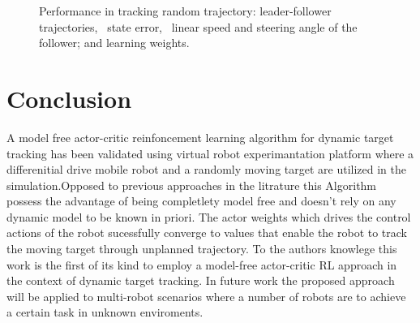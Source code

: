 \documentclass[conference]{IEEEtran}
\begin{document}
\begin{figure}[htbp]
\caption[Leader-follower performance for random trajectory.]{Performance in tracking random trajectory: 
   leader-follower trajectories,~ state error,~ linear speed and steering angle of the follower; and     learning weights.}%
  \label{fig:peformanceRandomTrajectory}%
	\label{fig:simulationResults}
\end{figure}


 \section{Conclusion} \label{sec:conclusion}
	A model free actor-critic reinfoncement learning algorithm for dynamic target tracking has been validated using virtual robot experimantation platform where a differenitial drive mobile robot and a randomly moving target are utilized in the simulation.Opposed to previous approaches in the litrature this Algorithm possess the advantage of being completlety model free and doesn't rely on any dynamic model to be known in priori. The actor weights which drives the control actions of the robot sucessfully converge to values that enable the robot to track the moving target through unplanned trajectory. To the authors knowlege this work is the first of its kind to employ a model-free actor-critic RL approach  in the context of dynamic target tracking. In future work the proposed approach will be applied to multi-robot scenarios where a number of robots are to achieve a certain task in unknown enviroments.          
 


	

\end{document}
